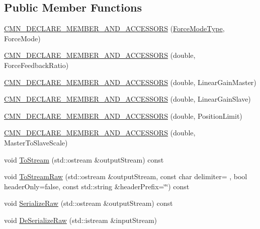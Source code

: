 \subsection*{Public Member Functions}
\begin{DoxyCompactItemize}
\item 
\hyperlink{classrob_collaborative_control_force_1_1_parameter_type_a3729d74e7903eea510b94d8facae00e0}{C\+M\+N\+\_\+\+D\+E\+C\+L\+A\+R\+E\+\_\+\+M\+E\+M\+B\+E\+R\+\_\+\+A\+N\+D\+\_\+\+A\+C\+C\+E\+S\+S\+O\+R\+S} (\hyperlink{classrob_collaborative_control_force_1_1_parameter_type_ab4ec71e97ffffd412993ea4f307e9acf}{Force\+Mode\+Type}, Force\+Mode)
\item 
\hyperlink{classrob_collaborative_control_force_1_1_parameter_type_a5e9e9bc1b7c3f35e98565ca17e1e1eaf}{C\+M\+N\+\_\+\+D\+E\+C\+L\+A\+R\+E\+\_\+\+M\+E\+M\+B\+E\+R\+\_\+\+A\+N\+D\+\_\+\+A\+C\+C\+E\+S\+S\+O\+R\+S} (double, Force\+Feedback\+Ratio)
\item 
\hyperlink{classrob_collaborative_control_force_1_1_parameter_type_ae5a2b5cc469e98da42afdfb4e464af92}{C\+M\+N\+\_\+\+D\+E\+C\+L\+A\+R\+E\+\_\+\+M\+E\+M\+B\+E\+R\+\_\+\+A\+N\+D\+\_\+\+A\+C\+C\+E\+S\+S\+O\+R\+S} (double, Linear\+Gain\+Master)
\item 
\hyperlink{classrob_collaborative_control_force_1_1_parameter_type_a514a93f3a329e401cf610ea701a1cfae}{C\+M\+N\+\_\+\+D\+E\+C\+L\+A\+R\+E\+\_\+\+M\+E\+M\+B\+E\+R\+\_\+\+A\+N\+D\+\_\+\+A\+C\+C\+E\+S\+S\+O\+R\+S} (double, Linear\+Gain\+Slave)
\item 
\hyperlink{classrob_collaborative_control_force_1_1_parameter_type_ad35007668c536c37668daecb13604865}{C\+M\+N\+\_\+\+D\+E\+C\+L\+A\+R\+E\+\_\+\+M\+E\+M\+B\+E\+R\+\_\+\+A\+N\+D\+\_\+\+A\+C\+C\+E\+S\+S\+O\+R\+S} (double, Position\+Limit)
\item 
\hyperlink{classrob_collaborative_control_force_1_1_parameter_type_a0cd2861b7e07317b3bc0833d5c014eff}{C\+M\+N\+\_\+\+D\+E\+C\+L\+A\+R\+E\+\_\+\+M\+E\+M\+B\+E\+R\+\_\+\+A\+N\+D\+\_\+\+A\+C\+C\+E\+S\+S\+O\+R\+S} (double, Master\+To\+Slave\+Scale)
\item 
void \hyperlink{classrob_collaborative_control_force_1_1_parameter_type_a42d756d52be5b88c5a31c429dd846e92}{To\+Stream} (std\+::ostream \&output\+Stream) const 
\item 
void \hyperlink{classrob_collaborative_control_force_1_1_parameter_type_a57de68744b1fc58013d95adaba398e07}{To\+Stream\+Raw} (std\+::ostream \&output\+Stream, const char delimiter= \textquotesingle{} \textquotesingle{}, bool header\+Only=false, const std\+::string \&header\+Prefix=\char`\"{}\char`\"{}) const 
\item 
void \hyperlink{classrob_collaborative_control_force_1_1_parameter_type_a5d5eed3b0e7a2c6f4dfc725bb21d03cb}{Serialize\+Raw} (std\+::ostream \&output\+Stream) const 
\item 
void \hyperlink{classrob_collaborative_control_force_1_1_parameter_type_a5f5427db7146cd28cab1ea939573f229}{De\+Serialize\+Raw} (std\+::istream \&input\+Stream)
\end{DoxyCompactItemize}


